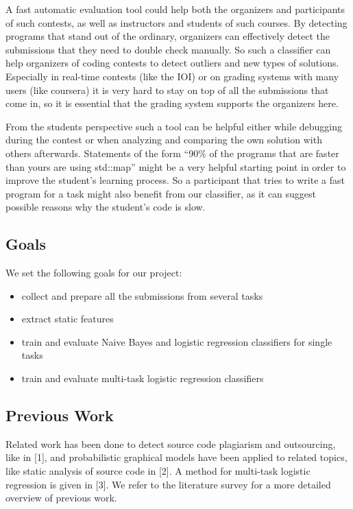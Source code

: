 A fast automatic evaluation tool could help both the organizers and participants of such contests, as well as instructors and students of such courses.
By detecting programs that stand out of the ordinary, organizers can effectively detect the submissions that they need to double check manually.
So such a classifier can help organizers of coding contests to detect outliers and new types of solutions. 
Especially in real-time contests (like the IOI) or on grading systems with many users (like coursera) it is very hard to stay on top of all the submissions that come in, so it is essential that the grading system supports the organizers here.

From the students perspective such a tool can be helpful either while debugging during the contest or when analyzing and comparing the own solution with others afterwards. Statements of the form “90\% of the programs that are faster than yours are using std::map” might be a very helpful starting point in order to improve the student’s learning process. So a participant that tries to write a fast program for a task might also benefit from our classifier, as it can suggest possible reasons why the student's code is slow.

\subsection*{Goals}
We set the following goals for our project:
\begin{itemize}
\item collect and prepare all the submissions from several tasks
\item extract static features 
\item train and evaluate Naive Bayes and logistic regression classifiers for single tasks
\item train and evaluate multi-task logistic regression classifiers
\end{itemize}

\subsection*{Previous Work}
Related work has been done to detect source code plagiarism and outsourcing, like in [1], and probabilistic graphical models have been applied to related topics, like static analysis of source code in [2].
A method for multi-task logistic regression is given in [3].
We refer to the literature survey for a more detailed overview of previous work.
